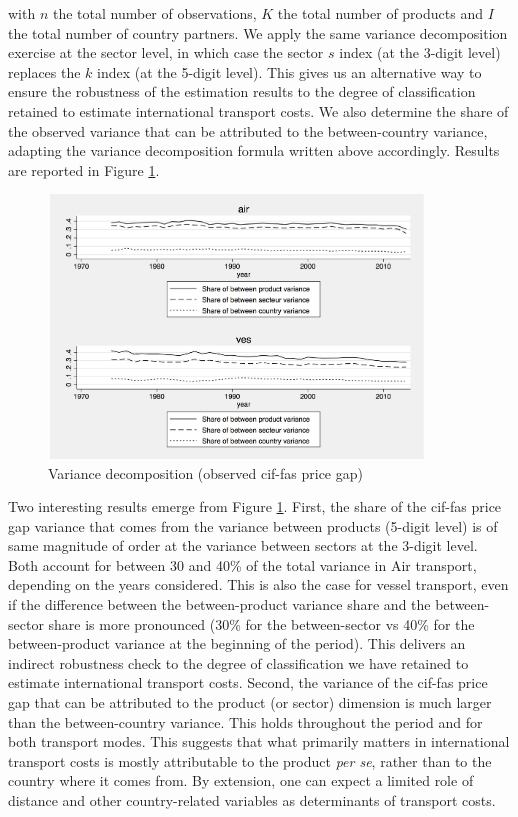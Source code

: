 \documentclass[a4paper,11pt]{article}
\begin{document}
\noindent with $n$ the total number of observations, $K$ the total number of products and $I$ the total number of country partners. We apply the same variance decomposition exercise at the sector level, in which case the sector $s$ index (at the 3-digit level) replaces the $k$ index (at the 5-digit level). This gives us an alternative way to ensure the robustness of the estimation results to the degree of classification retained to estimate international transport costs. We also determine the share of the observed variance that can be attributed to the between-country variance, adapting the variance decomposition formula written above accordingly. Results are reported in Figure \ref{fig:decomp_variance}.

\begin{figure}[htbp]
\caption{Variance decomposition (observed cif-fas price gap)}
\label{fig:decomp_variance}
\begin{center}
\includegraphics[width=10cm, height=7cm]{variance_decomposition.pdf}
\end{center}
\end{figure}

Two interesting results emerge from Figure \ref{fig:decomp_variance}. First, the share of the cif-fas price gap variance that comes from the variance between products (5-digit level) is of same magnitude of order at the variance between sectors at the 3-digit level. Both account for between 30 and 40\% of the total variance in Air transport, depending on the years considered. This is also the case for vessel transport, even if the difference between the between-product variance share and the between-sector share is more pronounced (30\% for the between-sector vs 40\% for the between-product variance at the beginning of the period). This delivers an indirect robustness check to the degree of classification we have retained to estimate international transport costs. Second, the variance of the cif-fas price gap that can be attributed to the product (or sector) dimension is much larger than the between-country variance. This holds throughout the period and for both transport modes. This suggests that what primarily matters in international transport costs is mostly attributable to the product \textit{per se}, rather than to the country where it comes from. By extension, one can expect a limited role of distance and other country-related variables as determinants of transport costs.
\end{document}
